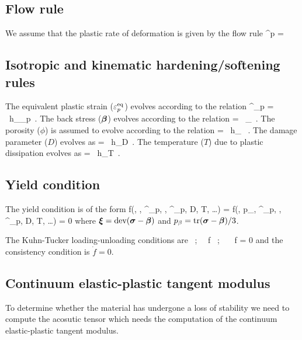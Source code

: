 \subsection{Flow rule}
We assume that the plastic rate of deformation is given by the flow rule
\Beq
  \BdT^p = \dot{\lambda}~\BM
\Eeq

\subsection{Isotropic and kinematic hardening/softening rules}
The equivalent plastic strain ($\varepsilon_p^{\text{eq}}$) evolves according to the relation
\Beq
  \dot{\Veps}^\Teq_p = \dot{\lambda}~h_{\Veps_p} \,.
\Eeq
The back stress ($\boldsymbol{\beta}$) evolves according to the relation
\Beq
  \dot{\Bbeta} = \dot{\lambda}~\Bh_{\beta} \,.
\Eeq
The porosity ($\phi$) is assumed to evolve according to the relation
\Beq
  \dot{\phi} = \dot{\lambda}~h_{\phi} ~.
\Eeq
The damage parameter ($D$) evolves as
\Beq
   = \dot{\lambda}~h_D \,.
\Eeq
The temperature ($T$) due to plastic dissipation evolves as
\Beq
   = \dot{\lambda}~h_T \,.
\Eeq

\subsection{Yield condition}
The yield condition is of the form
\Beq
  f(\Bsig, \Bbeta, \Veps^\Teq_p, \phi, \dot{\Veps}^\Teq_p, D, T, \dots) =
  f(\Bxi, p_\beta, \Veps^\Teq_p, \phi, \dot{\Veps}^\Teq_p, D, T, \dots) = 0
\Eeq
where $\boldsymbol{\xi} = \text{dev}(\boldsymbol{\sigma} - \boldsymbol{\beta})$ and $p_\beta = \text{tr}(\boldsymbol{\sigma} - \boldsymbol{\beta})/3$. 

The Kuhn-Tucker loading-unloading conditions are
\Beq
  \dot{\lambda}  ~;~~  f  ~;~~ \dot{\lambda}~f = 0
\Eeq
and the consistency condition is $\dot{f} = 0$.

\subsection{Continuum elastic-plastic tangent modulus}
To determine whether the material has undergone a loss of stability we need to compute
the acosutic tensor which needs the computation of the continuum elastic-plastic tangent
modulus.

